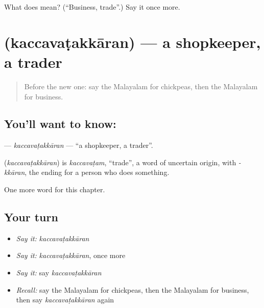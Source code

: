 \begin{tcolorbox}[breakable,colback=teal!4,colframe=teal!35!black,title={Before you move on}]
What does  mean? (\textquotedblleft{}Business, trade\textquotedblright{}.) Say it once more.
\end{tcolorbox}
\section[\texorpdfstring{\ml{കച്ചവടക്കാരൻ} (kaccavaṭakkāran)}{കച്ചവടക്കാരൻ (kaccavaṭakkāran)}]{ (kaccavaṭakkāran) — a shopkeeper, a trader}

\label{lesson:ML-C260-kaccavatakkaran}



\begin{quote}
Before the new one: say the Malayalam for chickpeas, then the Malayalam for business.
\end{quote}

\subsection*{You'll want to know: }
\textbf{} — \emph{kaccavaṭakkāran} — \textquotedblleft{}a shopkeeper, a trader\textquotedblright{}.

\begin{cousinweb}
\textbf{} (\emph{kaccavaṭakkāran}) is \emph{kaccavaṭam}, \textquotedblleft{}trade\textquotedblright{}, a word of uncertain origin, with \emph{-kkāran}, the ending for a person who does something.
\end{cousinweb}

\begin{grammarlens}[title={What you've built}]
One more word for this chapter.
\end{grammarlens}

\subsection*{Your turn}
\begin{itemize}
\raggedright
  \item \emph{Say it:} \emph{kaccavaṭakkāran}
  \item \emph{Say it:} \emph{kaccavaṭakkāran}, once more
  \item \emph{Say it:} say \emph{kaccavaṭakkāran}
  \item \emph{Recall:} say the Malayalam for chickpeas, then the Malayalam for business, then say \emph{kaccavaṭakkāran} again
\end{itemize}

